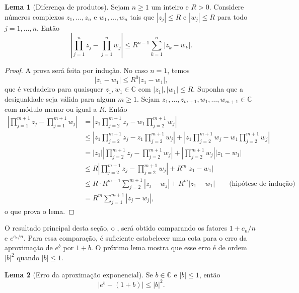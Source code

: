 \documentclass[12pt,portuguese]{article}
\theoremstyle{definition}
\newtheorem{lemma}[lemma]{Lema}
\theoremstyle{plainexercise}
\theoremstyle{starredexercise}
\theoremstyle{definition}
\begin{document}
\begin{lemma}[Diferença de produtos]\label{lem:man-diferenca-produtos}
Sejam $n\geqslant1$ um inteiro e $R>0$. Considere números complexos
$z_1,\ldots,z_n$ e $w_1,\ldots,w_n$ tais que
$|z_j|\leqslant R$ e $|w_j|\leqslant R$ para todo $j=1,\ldots,n$. Então
\[
\left|\prod_{j=1}^{n}z_j - \prod_{j=1}^{n}w_j\right|
\leqslant R^{n-1}\sum_{k=1}^{n}|z_k-w_k|.
\]
\end{lemma}

\begin{proof}
A prova será feita por indução. No caso $n=1$, temos
\[
|z_1-w_1|\leqslant R^{0}|z_1-w_1|,
\]
que é verdadeiro para quaisquer $z_1,w_1\in\mathbb{C}$ com $|z_1|,|w_1|\leqslant R$.
Suponha que a desigualdade seja válida para algum $m\geqslant 1$. Sejam
$z_1,\ldots,z_{m+1},w_1,\ldots,w_{m+1}\in\mathbb{C}$ com módulo menor ou igual a $R$.
Então
\begin{align*}
\left|\prod_{j=1}^{m+1}z_j - \prod_{j=1}^{m+1}w_j\right|
&= \left|z_1\prod_{j=2}^{m+1}z_j - w_1\prod_{j=2}^{m+1}w_j\right| \\
&\leqslant \left|z_1\prod_{j=2}^{m+1}z_j - z_1\prod_{j=2}^{m+1}w_j\right|
+ \left|z_1\prod_{j=2}^{m+1}w_j - w_1\prod_{j=2}^{m+1}w_j\right| \\
&= |z_1|\left|\prod_{j=2}^{m+1}z_j - \prod_{j=2}^{m+1}w_j\right|
+ \left|\prod_{j=2}^{m+1}w_j\right||z_1-w_1| \\
&\leqslant R\left|\prod_{j=2}^{m+1}z_j - \prod_{j=2}^{m+1}w_j\right| + R^{m}|z_1-w_1| \\
&\leqslant R\cdot R^{m-1}\sum_{j=2}^{m+1}|z_j-w_j| + R^{m}|z_1-w_1|
\qquad\text{(hipótese de indução)} \\
&= R^{m}\sum_{j=1}^{m+1}|z_j-w_j|,
\end{align*}
o que prova o lema.
\end{proof}

O resultado principal desta seção, o ,
será obtido comparando os fatores $1+c_n/n$ e $e^{c_n/n}$.
Para essa comparação, é suficiente estabelecer
uma cota para o erro da aproximação de $e^b$ por $1+b$. O próximo lema
mostra que esse erro é de ordem $|b|^2$ quando $|b|\leqslant1$.

\begin{lemma}[Erro da aproximação exponencial]\label{lem:man-exp-quadratica}
Se $b\in\mathbb{C}$ e $|b|\leqslant 1$, então
\[
\bigl|e^{b}-(1+b)\bigr|\leqslant |b|^{2}.
\]
\end{lemma}
\end{document}

